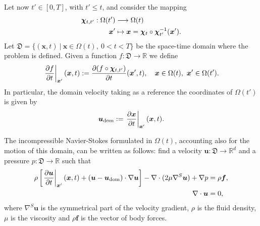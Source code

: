 \documentclass[11pt,a4paper,oneside,reqno]{amsart}
\def\map{{\bm\chi}}
\def\x{{\bm x}}
\def\u{{\bm u}}
\def\f{{\bm f}}
\def\cl{\nonumber\\}
\def\el{{\nonumber}}
\def\xs{{\bm x}}
\begin{document}
Let now $t'\in [0,T]$, with $t'\leq t$, and consider the mapping
\begin{align}
\map_{t,t'} : \Omega(t') & \longrightarrow \Omega(t)\cl
               \x' & \mapsto  \x = \map_t\circ\map_{t'}^{-1}(\x').\el
\end{align}
Let $\mathfrak{D} =\{(\x,t)~\vert~\x \in\Omega(t),~0<t<T\}$ be the space-time domain where the problem is defined. Given a function $f : \mathfrak{D} \longrightarrow {\mathbb R}$ we define
\begin{align}
\left.\frac{\partial f}{\partial t}\right\vert_{\xs'} (\x,t)
:= \frac{\partial (f\circ\map_{t,t'})}{\partial t}(\x',t),\quad \x\in\Omega(t), ~\x'\in \Omega(t'). \el
\end{align}
In particular, the domain velocity taking as a reference the coordinates of $\Omega(t')$ is given by
\begin{align}
\u_{\rm dom} := \left.\frac{\partial \x}{\partial t}\right\vert_{\xs'} (\x,t).\label{eq:ch3domvel}
\end{align}

The incompressible Navier-Stokes formulated in $\Omega(t)$, accounting also for the motion of this
domain, can be written as follows: find a velocity $\u:\mathfrak{D}\longrightarrow {\mathbb R}^d$ 
and a pressure $p:\mathfrak{D}\longrightarrow {\mathbb R}$ such that
\begin{align}
\rho \left[\left.\frac{\partial \u}{\partial t}\right\vert_{\xs'} (\x,t) + (\u-{ \u_{\rm dom}})\cdot\nabla\u \right] 
- \nabla\cdot(2\mu\nabla^S\u) + \nabla p & = \rho\f,  \label{eq:ch3ns1}\\
\nabla\cdot\u & = 0, \label{eq:ch3ns2}
\end{align}
where $\nabla^S\u$ is the symmetrical part of the velocity gradient, $\rho$ is the fluid density, $\mu$ is the viscosity and $\rho\f$ is the vector of body forces.
\end{document}

